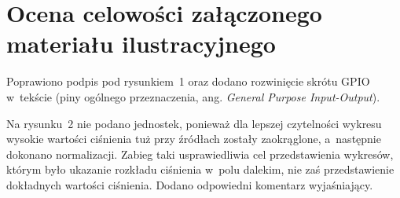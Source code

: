 \documentclass[12pt]{article}
\begin{document}
\section{Ocena celowości załączonego materiału ilustracyjnego}

Poprawiono podpis pod rysunkiem~1 oraz dodano rozwinięcie skrótu GPIO w~tekście
(piny ogólnego przeznaczenia, ang. \textit{General Purpose Input-Output}).

Na rysunku~2 nie podano jednostek, ponieważ dla lepszej czytelności wykresu
wysokie wartości ciśnienia tuż przy źródłach zostały zaokrąglone, a~następnie
dokonano normalizacji. Zabieg taki usprawiedliwia cel przedstawienia wykresów,
którym było ukazanie rozkładu ciśnienia w~polu dalekim, nie zaś przedstawienie
dokładnych wartości ciśnienia. Dodano odpowiedni komentarz wyjaśniający.

%
%
%
%
\end{document}
